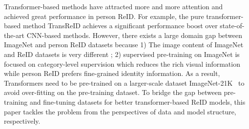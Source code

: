 \documentclass[10pt,twocolumn,letterpaper]{article}
\begin{document}
Transformer-based methods \cite{he2021transreid, zhang2021hat} have attracted more and more attention and achieved great performance in person ReID. For example, the pure transformer-based method TransReID \cite{he2021transreid} achieves a significant performance boost over state-of-the-art CNN-based methods. However, there exists a large domain gap between ImageNet and person ReID datasets because 1) The image content of ImageNet and ReID datasets is very different \cite{fu2021unsupervised}; 2) supervised pre-training on ImageNet is focused on category-level supervision which reduces the rich visual information \cite{dino} while person ReID prefers fine-grained identity information. As a result, Transformers need to be pre-trained on a larger-scale dataset ImageNet-21K~\cite{deng2009imagenet} to avoid over-fitting on the pre-training dataset. To bridge the gap between pre-training and fine-tuning datasets for better transformer-based ReID models, this paper tackles the problem from the perspectives of data and model structure, respectively. 
\end{document}
